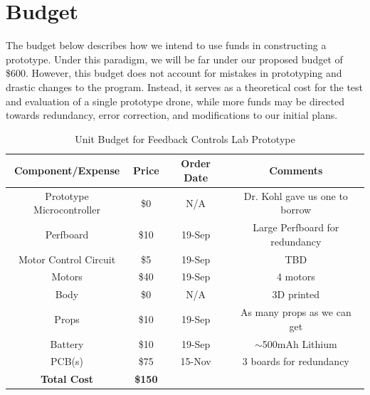 \documentclass[12pt, titlepage]{article}
\begin{document}
\section{Budget}
The budget below describes how we intend to use funds in constructing a prototype. Under this paradigm, we will be far under our proposed budget of \$600. However, this budget does not account for mistakes in prototyping and drastic changes to the program. Instead, it serves as a theoretical cost for the test and evaluation of a single prototype drone, while more funds may be directed towards redundancy, error correction, and modifications to our initial plans.
\begin{table}[h!]
\centering
\caption{Unit Budget for Feedback Controls Lab Prototype}
\label{tab:budget}
\begin{tabular}{||c|c|c|c||}
\hline 
\hline
\textbf{Component/Expense} & \textbf{Price} & \textbf{Order Date} & \textbf{Comments} \\ 
\hline 
Prototype Microcontroller & \$0 & N/A & Dr. Kohl gave us one to borrow \\
\hline 
Perfboard & \$10 & 19-Sep & Large Perfboard for redundancy \\ 
\hline 
Motor Control Circuit & \$5 & 19-Sep & TBD \\ 
\hline 
Motors & \$40 & 19-Sep & 4 motors \\ 
\hline 
Body & \$0 & N/A & 3D printed \\ 
\hline 
Props & \$10 & 19-Sep & As many props as we can get \\ 
\hline 
Battery & \$10 & 19-Sep & $\sim$500mAh Lithium \\ 
\hline 
PCB(s) & \$75 & 15-Nov & 3 boards for redundancy \\ 
\hline 
\textbf{Total Cost} & \textbf{\$150} &  &  \\ 
\hline 
\hline
\end{tabular} 
\end{table}
\end{document}
